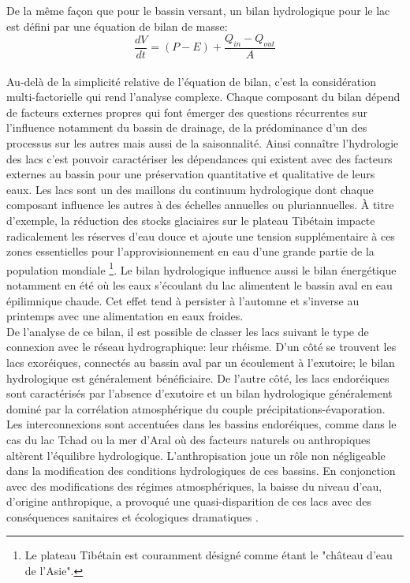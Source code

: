 De la même façon que pour le bassin versant, un bilan hydrologique pour le lac est défini par une équation de bilan de masse: \\

\begin{equation}
\frac{dV}{dt} = (P-E) + \frac{Q_{in}-Q_{out}}{A}
\end{equation}
~\\
Au-delà de la simplicité relative de l'équation de bilan, c'est la considération multi-factorielle qui rend l'analyse complexe. Chaque composant du bilan dépend de facteurs externes propres qui font émerger des questions récurrentes sur l'influence notamment du bassin de drainage, de la prédominance d'un des processus sur les autres mais aussi de la saisonnalité. Ainsi connaître l'hydrologie des lacs c'est pouvoir caractériser les dépendances qui existent avec des facteurs externes au bassin pour une préservation quantitative et qualitative de leurs eaux. Les lacs sont un des maillons du continuum hydrologique dont chaque composant influence les autres à des échelles annuelles ou pluriannuelles. À titre d'exemple, la réduction des stocks glaciaires sur le plateau Tibétain impacte radicalement les réserves d'eau douce et ajoute une tension supplémentaire à ces zones essentielles pour l'approvisionnement en eau d'une grande partie de la population mondiale \footnote{Le plateau Tibétain est couramment désigné comme étant le "château d'eau de l'Asie".}. Le bilan hydrologique influence aussi le bilan énergétique notamment en été où les eaux s'écoulant du lac alimentent le bassin aval en eau épilimnique chaude. Cet effet tend à persister à l'automne et s'inverse au printemps avec une alimentation en eaux froides. \\

De l'analyse de ce bilan, il est possible de classer les lacs suivant le type de connexion avec le réseau hydrographique: leur rhéisme. D'un côté se trouvent les lacs exoréiques, connectés au bassin aval par un écoulement à l'exutoire; le bilan hydrologique est généralement bénéficiaire. De l'autre côté, les lacs endoréiques sont caractérisés par l'absence d'exutoire et un bilan hydrologique généralement dominé par la corrélation atmosphérique du couple précipitations-évaporation. \\
Les interconnexions sont accentuées dans les bassins endoréiques, comme dans le cas du lac Tchad ou la mer d'Aral où des facteurs naturels ou anthropiques altèrent l'équilibre hydrologique. L'anthropisation joue un rôle non négligeable dans la modification des conditions hydrologiques de ces bassins. En conjonction avec des modifications des régimes atmosphériques, la baisse du niveau d'eau, d'origine anthropique, a provoqué une quasi-disparition de ces lacs avec des conséquences sanitaires et écologiques dramatiques \citep{philip2007,gao2011}.\\

